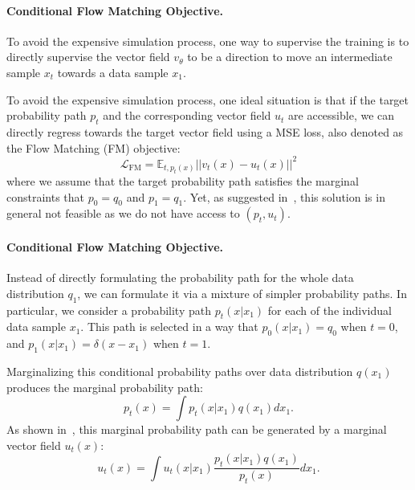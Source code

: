 \paragraph{Conditional Flow Matching Objective.}
To avoid the expensive simulation process, one way to supervise the training is to directly supervise the vector field $v_\theta$ to be a direction to move an intermediate sample $x_t$ towards a data sample $x_1$.


To avoid the expensive simulation process, one ideal situation is that if the target probability path $p_t$ and the corresponding vector field $u_t$ are accessible, we can directly regress towards the target vector field using a MSE loss, also denoted as the Flow Matching (FM) objective:
\begin{equation}
\label{eq:fm_loss}
    \mathcal{L}_{\text{FM}} = \mathbb{E}_{t,p_t(x)}||v_t(x) - u_t(x)||^2
\end{equation}
%
where we assume that the target probability path satisfies the marginal constraints that $p_0 = q_0$ and $p_1 = q_1$.
Yet, as suggested in~\cite{lipman2022flow}, this solution is in general not feasible as we do not have access to $(p_t, u_t)$.

\paragraph{Conditional Flow Matching Objective.}
Instead of directly formulating the probability path for the whole data distribution $q_1$, we can formulate it via a mixture of simpler probability paths.
%
In particular, we consider a probability path $p_t(x|x_1)$ for each of the individual data sample $x_1$.
%
This path is selected in a way that $p_0(x|x_1) = q_0$ when $t = 0$, and $p_1(x|x_1) = \delta(x - x_1)$ when $t=1$.

Marginalizing this conditional probability paths over data distribution $q(x_1)$ produces the marginal probability path:
\begin{equation}
    p_t(x) = \int p_t(x|x_1) q(x_1) dx_1.
\end{equation}
As shown in~\cite{lipman2022flow}, this marginal probability path can be generated by a marginal vector field $u_t(x)$:
\begin{equation}
    u_t(x) = \int u_t(x|x_1) \frac{p_t(x|x_1) q(x_1)}{p_t(x)} dx_1.
\end{equation}

